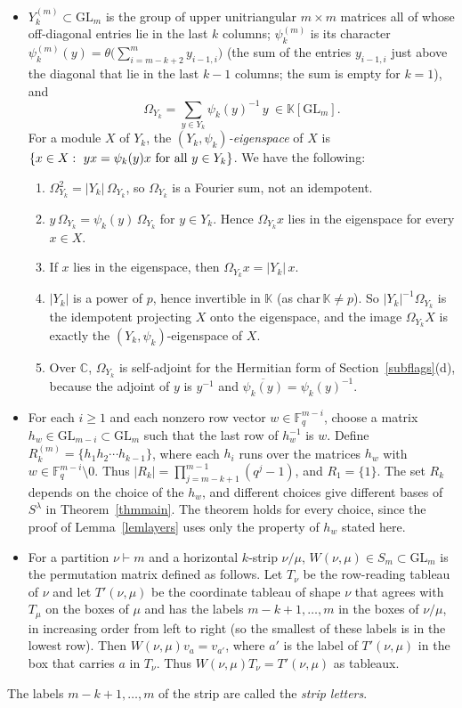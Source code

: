 \documentclass[11pt, letterpaper]{amsart}
\let\amstext\text
\renewcommand{\text}[1]{\amstext{\upshape #1}}%
\theoremstyle{definition}
\theoremstyle{remark}
\newcommand{\FF}{\mathbb{F}}
\newcommand{\KK}{\mathbb{K}}
\newcommand{\CC}{\mathbb{C}}
\newcommand{\GL}{\mathrm{GL}}
\begin{document}
\begin{itemize}
\item $Y^{(m)}_k\subset\GL_m$ is the group of upper unitriangular $m\times m$ matrices all of whose off-diagonal entries lie in the last $k$ columns; $\psi^{(m)}_k$ is its character $\psi^{(m)}_k(y)=\theta\bigl(\sum_{i=m-k+2}^{m}y_{i-1,i}\bigr)$ (the sum of the entries $y_{i-1,i}$ just above the diagonal that lie in the last $k-1$ columns; the sum is empty for $k=1$), and
\[
\Omega_{Y_k}=\sum_{y\in Y_k}\psi_k(y)^{-1}\,y\ \in\KK[\GL_m].
\]
For a module $X$ of $Y_k$, the \emph{$(Y_k,\psi_k)$-eigenspace} of $X$ is $\{x\in X:\ yx=\psi_k(y)x\ \text{for all}\ y\in Y_k\}$. We have the following:
\begin{enumerate}
\item[(i)] $\Omega_{Y_k}^2=|Y_k|\,\Omega_{Y_k}$, so $\Omega_{Y_k}$ is a Fourier sum, not an idempotent.
\item[(ii)] $y\,\Omega_{Y_k}=\psi_k(y)\,\Omega_{Y_k}$ for $y\in Y_k$. Hence $\Omega_{Y_k}x$ lies in the eigenspace for every $x\in X$.
\item[(iii)] If $x$ lies in the eigenspace, then $\Omega_{Y_k}x=|Y_k|\,x$.
\item[(iv)] $|Y_k|$ is a power of $p$, hence invertible in $\KK$ (as $\mathrm{char}\,\KK\ne p$). So $|Y_k|^{-1}\Omega_{Y_k}$ is the idempotent projecting $X$ onto the eigenspace, and the image $\Omega_{Y_k}X$ is exactly the $(Y_k,\psi_k)$-eigenspace of $X$.
\item[(v)] Over $\CC$, $\Omega_{Y_k}$ is self-adjoint for the Hermitian form of Section~\ref{subflags}(d), because the adjoint of $y$ is $y^{-1}$ and $\overline{\psi_k(y)}=\psi_k(y)^{-1}$.
\end{enumerate}
\item For each $i\ge1$ and each nonzero row vector $w\in\FF_q^{m-i}$, choose a matrix $h_w\in\GL_{m-i}\subset\GL_m$ such that the last row of $h_w^{-1}$ is $w$. Define
$R^{(m)}_k=\{h_1h_2\cdots h_{k-1}\}$, where each $h_i$ runs over the matrices $h_w$ with $w\in\FF_q^{m-i}\setminus0$. Thus $|R_k|=\prod_{j=m-k+1}^{m-1}(q^j-1)$, and $R_1=\{1\}$. The set $R_k$ depends on the choice of the $h_w$, and different choices give different bases of $S^\lambda$ in Theorem~\ref{thmmain}. The theorem holds for every choice, since the proof of Lemma~\ref{lemlayers} uses only the property of $h_w$ stated here.
\item For a partition $\nu\vdash m$ and a horizontal $k$-strip $\nu/\mu$, $W(\nu,\mu)\in S_m\subset\GL_m$ is the permutation matrix defined as follows. Let $T_\nu$ be the row-reading tableau of $\nu$ and let $T'(\nu,\mu)$ be the coordinate tableau of shape $\nu$ that agrees with $T_\mu$ on the boxes of $\mu$ and has the labels $m-k+1,\dots,m$ in the boxes of $\nu/\mu$, in increasing order from left to right (so the smallest of these labels is in the lowest row). Then $W(\nu,\mu)v_a=v_{a'}$, where $a'$ is the label of $T'(\nu,\mu)$ in the box that carries $a$ in $T_\nu$. Thus $W(\nu,\mu)T_\nu=T'(\nu,\mu)$ as tableaux.
\end{itemize}
The labels $m-k+1,\dots,m$ of the strip are called the \emph{strip letters}.
\end{document}
